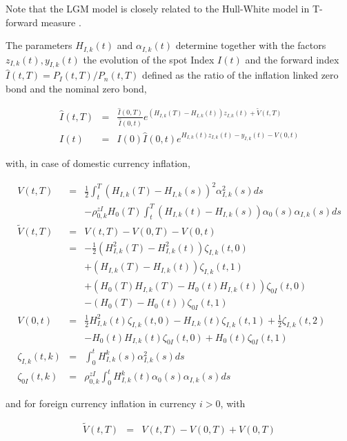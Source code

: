 \documentclass[12pt, a4paper]{article}
\begin{document}
\begin{appendix}
Note that the LGM model is closely related to the Hull-White model in T-forward measure \cite{Lichters}.

\medskip The parameters $H_{I,k}(t)$ and $\alpha_{I,k}(t)$ determine together with the factors $z_{I,k}(t), y_{I,k}(t)$
the evolution of the spot Index $I(t)$ and the forward index $\hat{I}(t,T) = P_I(t,T) / P_n(t,T)$ defined as the ratio
of the inflation linked zero bond and the nominal zero bond,

\begin{eqnarray*}
  \hat{I}(t,T) &=& \frac{\hat{I}(0,T)}{\hat{I}(0,t)} e^{(H_{I,k}(T)-H_{I,k}(t))z_{I,k}(t)+\tilde{V}(t,T)} \\
  I(t) &=& I(0) \hat{I}(0,t)e^{H_{I,k}(t)z_{I,k}(t)-y_{I,k}(t)-V(0,t)}
\end{eqnarray*}

with, in case of domestic currency inflation,

\begin{eqnarray*}
  V(t,T) &=& \frac{1}{2} \int_t^T (H_{I,k}(T)-H_{I,k}(s))^2 \alpha_{I,k}^2(s) ds \\
         & & - \rho^{zI}_{0,k} H_0(T) \int_t^T (H_{I,k}(t)-H_{I,k}(s))\alpha_0(s)\alpha_{I,k}(s)ds \\
  \tilde{V}(t,T) &=& V(t,T) - V(0,T) -V(0,t) \\
         &=& -\frac{1}{2}(H_{I,k}^2(T)-H_{I,k}^2(t))\zeta_{I,k}(t,0) \\
         & & +(H_{I,k}(T)-H_{I,k}(t)) \zeta_{I,k}(t,1) \\
         & & +(H_0(T)H_{I,k}(T) - H_0(t)H_{I,k}(t))\zeta_{0I}(t,0) \\
         & & -(H_0(T)-H_0(t))\zeta_{0I}(t,1) \\
  V(0,t) &=& \frac{1}{2}H_{I,k}^2(t)\zeta_{I,k}(t,0)-H_{I,k}(t)\zeta_{I,k}(t,1)+\frac{1}{2}\zeta_{I,k}(t,2) \\
         & & -H_0(t)H_{I,k}(t)\zeta_{0I}(t,0)+H_0(t)\zeta_{0I}(t,1) \\
  \zeta_{I,k}(t,k) &=& \int_0^t H_{I,k}^k(s)\alpha_{I,k}^2(s) ds \\
  \zeta_{0I}(t,k) &=& \rho^{zI}_{0,k}\int_0^t H_{I,k}^k(t) \alpha_0(s) \alpha_{I,k}(s) ds
\end{eqnarray*}

and for foreign currency inflation in currency $i>0$, with

\begin{eqnarray*}
  \tilde{V}(t,T) &=& V(t,T) -V(0,T) + V(0,T)
\end{eqnarray*}


\end{appendix}
\end{document}
